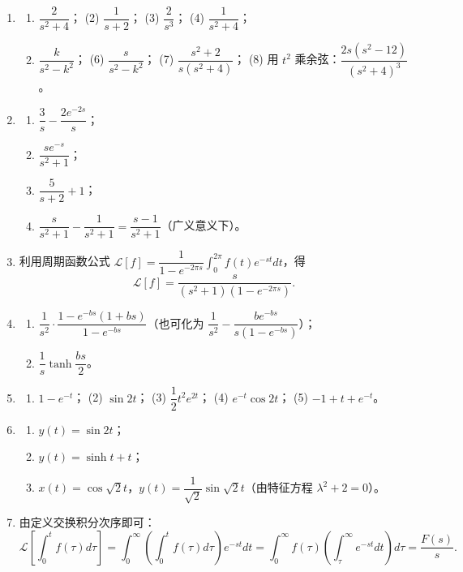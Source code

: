 \begin{enumerate}
\def\labelenumi{\arabic{enumi}.}
\item
  \begin{enumerate}
  \def\labelenumii{(\arabic{enumii})}
  \tightlist
  \item
    \(\dfrac{2}{s^2+4}\)； (2) \(\dfrac{1}{s+2}\)； (3)
    \(\dfrac{2}{s^3}\)； (4) \(\dfrac{1}{s^2+4}\)；
  \item
    \(\dfrac{k}{s^2-k^2}\)； (6) \(\dfrac{s}{s^2-k^2}\)； (7)
    \(\dfrac{s^2+2}{s(s^2+4)}\)； (8) 用 \(t^2\)
    乘余弦：\(\dfrac{2s(s^2-12)}{(s^2+4)^3}\)。
  \end{enumerate}
\item
  \begin{enumerate}
  \def\labelenumii{(\arabic{enumii})}
  \tightlist
  \item
    \(\dfrac{3}{s}-\dfrac{2e^{-2s}}{s}\)；
  \item
    \(\dfrac{s e^{-s}}{s^2+1}\)；
  \item
    \(\dfrac{5}{s+2}+1\)；
  \item
    \(\dfrac{s}{s^2+1}-\dfrac{1}{s^2+1}=\dfrac{s-1}{s^2+1}\)（广义意义下）。
  \end{enumerate}
\item
  利用周期函数公式
  \(\mathcal L[f]=\dfrac{1}{1-e^{-2\pi s}}\int_0^{2\pi}f(t)e^{-st}dt\)，得
  \[
  \mathcal L[f]=\dfrac{s}{(s^2+1)(1-e^{-2\pi s})} .
  \]
\item
  \begin{enumerate}
  \def\labelenumii{(\arabic{enumii})}
  \tightlist
  \item
    \(\dfrac{1}{s^2}\cdot\dfrac{1-e^{-bs}(1+bs)}{1-e^{-bs}}\)（也可化为
    \(\dfrac{1}{s^2}-\dfrac{b e^{-bs}}{s(1-e^{-bs})}\)）；
  \item
    \(\dfrac{1}{s}\tanh\dfrac{bs}{2}\)。
  \end{enumerate}
\item
  \begin{enumerate}
  \def\labelenumii{(\arabic{enumii})}
  \tightlist
  \item
    \(1-e^{-t}\)； (2) \(\sin2t\)； (3) \(\dfrac12t^2e^{2t}\)； (4)
    \(e^{-t}\cos2t\)； (5) \(-1+t+e^{-t}\)。
  \end{enumerate}
\item
  \begin{enumerate}
  \def\labelenumii{(\arabic{enumii})}
  \tightlist
  \item
    \(y(t)=\sin2t\)；
  \item
    \(y(t)=\sinh t+t\)；
  \item
    \(x(t)=\cos\sqrt2 t\)，\(y(t)=\dfrac1{\sqrt2}\sin\sqrt2 t\)（由特征方程
    \(\lambda^2+2=0\)）。
  \end{enumerate}
\item
  由定义交换积分次序即可： \[
  \mathcal L\left[\int_0^t f(\tau)d\tau\right]
  =\int_0^\infty\left(\int_0^t f(\tau)d\tau\right)e^{-st}dt
  =\int_0^\infty f(\tau)\left(\int_\tau^\infty e^{-st}dt\right)d\tau
  =\dfrac{F(s)}{s}.
  \]
\end{enumerate}

